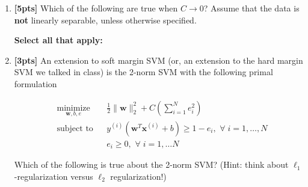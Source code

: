 \documentclass[12pt]{article}
\begin{document}
\begin{enumerate}
    
    \clearpage
    
    \item \textbf{[5pts]} Which of the following are true when $C \rightarrow 0$? Assume that the data is \textbf{not} linearly separable, unless otherwise specified.
    
    \textbf{Select all that apply:}
    
    
    
    \item \textbf{[3pts]} An extension to soft margin SVM (or, an extension to the hard margin SVM we talked in class) is the 2-norm SVM with the following primal formulation
    
    \begin{equation*}
        \begin{aligned}
        & \underset{\mathbf{w}, b, e}{\text{minimize}}
        & & \frac{1}{2}\|\mathbf{w}\|_2^2 + C\left(\sum_{i = 1}^N e_i^2\right)\\
        & \text{subject to}
        & & y^{(i)}(\mathbf{w}^T\mathbf{x}^{(i)} + b) \geq 1 - e_i, \, \, \forall \; i = 1, \dots, N\\
        & & & e_i \geq 0, \, \, \forall \; i = 1, \dots N
        \end{aligned}
    \end{equation*}
    
    Which of the following is true about the 2-norm SVM? (Hint: think about $\ell_1$-regularization versus $\ell_2$ regularization!)
    

\end{enumerate}
\end{document}
